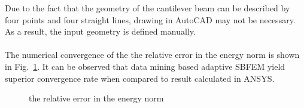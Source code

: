Due to the fact that the geometry of the cantilever beam can be described by four points and four straight lines, drawing in AutoCAD may not be necessary.
As a result, the input geometry is defined manually.


\paragraph{}
The numerical convergence of the the relative error in the energy norm is shown in Fig.~\ref{adap_fig:ex_short_cantilever_convergence}.
It can be observed that data mining based adaptive SBFEM yield superior convergence rate when compared to result calculated in ANSYS.

\begin{figure}[h!]
    \centering
    \caption{the relative error in the energy norm}
    \label{adap_fig:ex_short_cantilever_convergence}
\end{figure}

